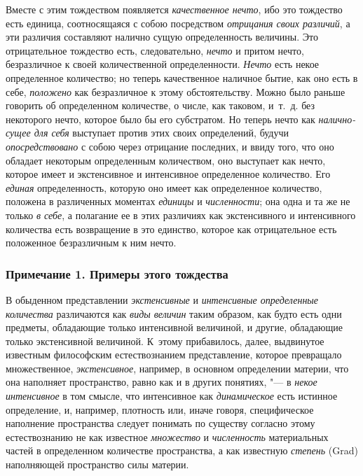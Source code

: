 Вместе с этим тождеством появляется {\em качественное
нечто}, ибо это тождество есть единица, соотносящаяся с собою посредством
{\em отрицания своих различий}, а эти различия
составляют налично сущую определенность величины. Это отрицательное
тождество есть, следовательно, {\em нечто} и притом
нечто, безразличное к своей количественной определенности.
{\em Нечто} есть некое определенное количество; но
теперь качественное наличное бытие, как оно есть в себе,
{\em положено} как безразличное к этому обстоятельству.
Можно было раньше говорить об определенном количестве, о числе, как
таковом, и~т.~д. без некоторого нечто, которое было бы его субстратом. Но
теперь нечто как {\em налично-сущее для себя} выступает
против этих своих определений, будучи
{\em опосредствовано} с собою через отрицание
последних, и ввиду того, что оно обладает некоторым определенным
количеством, оно выступает как нечто, которое имеет и экстенсивное и
интенсивное определенное количество. Его {\em единая}
определенность, которую оно имеет как определенное количество, положена в
различенных моментах {\em единицы} и
{\em численности}; она одна и та же не только
{\em в себе}, а полагание ее в этих различиях как
экстенсивного и интенсивного количества есть возвращение в это единство,
которое как отрицательное есть положенное безразличным к ним нечто.


\subsubsection[Примечание 1. Примеры этого тождества]{Примечание 1. Примеры этого тождества}

В обыденном представлении {\em экстенсивные} и
{\em интенсивные определенные количества} различаются
как {\em виды величин} таким образом, как будто есть
одни предметы, обладающие только интенсивной величиной, и другие,
обладающие только экстенсивной величиной. К~этому прибавилось, далее,
выдвинутое известным философским естествознанием представление, которое
превращало множественное, {\em экстенсивное}, например,
в основном определении материи, что она наполняет пространство, равно как и
в других понятиях, "--- в {\em некое интенсивное} в том
смысле, что интенсивное как {\em динамическое} есть
истинное определение, и, например, плотность или, иначе говоря,
специфическое наполнение пространства следует понимать по существу согласно
этому естествознанию не как известное {\em множество} и
{\em численность} материальных частей в определенном
количестве пространства, а как известную {\em степень}
(Grad) наполняющей пространство силы материи.

